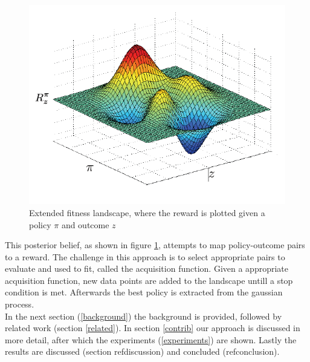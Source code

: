 \begin{figure}[ht]
  \centering
  \includegraphics[scale=0.5]{images/fitness-landscape.png}
  \caption{Extended fitness landscape, where the reward is plotted given a policy $\pi$ and outcome $z$}\label{fitnesslandscape}
\end{figure}

This posterior belief, as shown in figure \ref{fitnesslandscape}, attempts to map policy-outcome pairs to a reward. The challenge in this approach is to select appropriate pairs to evaluate and used to fit, called the acquisition function. Given a appropriate acquisition function, new data points are added to the landscape untill a stop condition is met. Afterwards the best policy is extracted from the gaussian process. \\


In the next section (\ref{background}) the background is provided, followed by related work (section \ref{related}). In section \ref{contrib} our approach is discussed in more detail, after which the experiments (\ref{experiments}) are shown. Lastly the results are discussed (section ref{discussion}) and concluded (ref{conclusion}).


